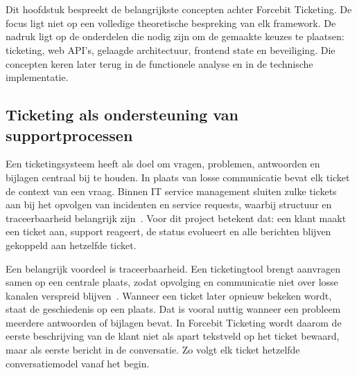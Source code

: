 \chapter{}%
\label{ch:stand-van-zaken}

%
%
%

Dit hoofdstuk bespreekt de belangrijkste concepten achter Forcebit Ticketing. De focus ligt niet op een volledige theoretische bespreking van elk framework. De nadruk ligt op de onderdelen die nodig zijn om de gemaakte keuzes te plaatsen: ticketing, web API's, gelaagde architectuur, frontend state en beveiliging. Die concepten keren later terug in de functionele analyse en in de technische implementatie.

\section{Ticketing als ondersteuning van supportprocessen}

Een ticketingsysteem heeft als doel om vragen, problemen, antwoorden en bijlagen centraal bij te houden. In plaats van losse communicatie bevat elk ticket de context van een vraag. Binnen IT service management sluiten zulke tickets aan bij het opvolgen van incidenten en service requests, waarbij structuur en traceerbaarheid belangrijk zijn~\autocite{Axelos2019ITIL4Foundation,ISOIEC20000One2018}. Voor dit project betekent dat: een klant maakt een ticket aan, support reageert, de status evolueert en alle berichten blijven gekoppeld aan hetzelfde ticket.

Een belangrijk voordeel is traceerbaarheid. Een ticketingtool brengt aanvragen samen op een centrale plaats, zodat opvolging en communicatie niet over losse kanalen verspreid blijven~\autocite{AtlassianTicketingSystem2026}. Wanneer een ticket later opnieuw bekeken wordt, staat de geschiedenis op een plaats. Dat is vooral nuttig wanneer een probleem meerdere antwoorden of bijlagen bevat. In Forcebit Ticketing wordt daarom de eerste beschrijving van de klant niet als apart tekstveld op het ticket bewaard, maar als eerste bericht in de conversatie. Zo volgt elk ticket hetzelfde conversatiemodel vanaf het begin.


